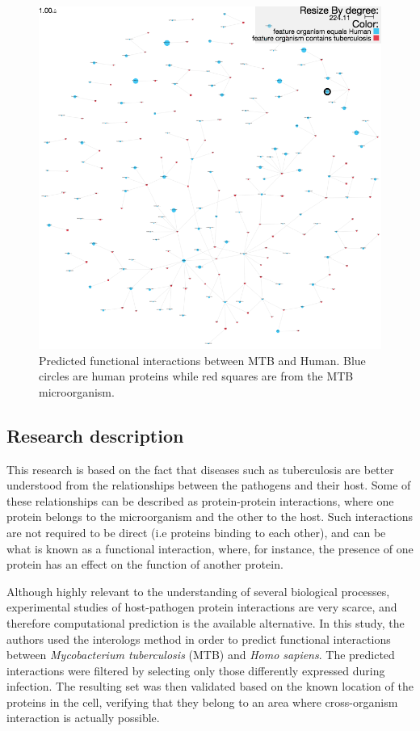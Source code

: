 \begin{figure}
\centering
\includegraphics[width=5in]{figures/pinv_human_mtb.png}
\caption[Predicted functional interactions between MTB and Human]{Predicted functional interactions between MTB and Human. Blue circles are human proteins while red squares are from the MTB microorganism.
\label{fig:pinv_human_mtb}}
\end{figure}

\subsection{Research description}
This research is based on the fact that diseases such as tuberculosis are better understood from the relationships between the pathogens and their host. Some of these relationships can be described as protein-protein interactions, where one protein belongs to the microorganism and the other to the host. Such interactions are not required to be direct (i.e proteins binding to each other), and can be what is known as a functional interaction, where, for instance,  the presence of one protein has an effect on the function of another protein. 

Although highly relevant to the understanding of several biological processes, experimental studies of host-pathogen protein interactions are very scarce, and therefore computational prediction is the available alternative. In this study, the authors used the interologs method in order to predict functional interactions between \emph{Mycobacterium tuberculosis} (MTB) and \emph{Homo sapiens}. The predicted interactions were filtered by selecting only those differently expressed during infection. The resulting set was then validated based on the known location of the proteins in the cell, verifying that they belong to an area where cross-organism interaction is actually possible. 

